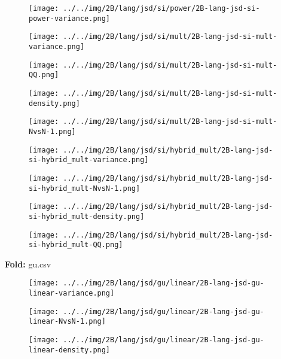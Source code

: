 \begin{figure}[H]
\centering	\texttt{[image: ../../img/2B/lang/jsd/si/power/2B-lang-jsd-si-power-variance.png]}
\end{figure}
\begin{figure}[H]
\centering	\texttt{[image: ../../img/2B/lang/jsd/si/mult/2B-lang-jsd-si-mult-variance.png]}
\end{figure}
\begin{figure}[H]
\centering	\texttt{[image: ../../img/2B/lang/jsd/si/mult/2B-lang-jsd-si-mult-QQ.png]}
\end{figure}
\begin{figure}[H]
\centering	\texttt{[image: ../../img/2B/lang/jsd/si/mult/2B-lang-jsd-si-mult-density.png]}
\end{figure}
\begin{figure}[H]
\centering	\texttt{[image: ../../img/2B/lang/jsd/si/mult/2B-lang-jsd-si-mult-NvsN-1.png]}
\end{figure}
\begin{figure}[H]
\centering	\texttt{[image: ../../img/2B/lang/jsd/si/hybrid\_mult/2B-lang-jsd-si-hybrid\_mult-variance.png]}
\end{figure}
\begin{figure}[H]
\centering	\texttt{[image: ../../img/2B/lang/jsd/si/hybrid\_mult/2B-lang-jsd-si-hybrid\_mult-NvsN-1.png]}
\end{figure}
\begin{figure}[H]
\centering	\texttt{[image: ../../img/2B/lang/jsd/si/hybrid\_mult/2B-lang-jsd-si-hybrid\_mult-density.png]}
\end{figure}
\begin{figure}[H]
\centering	\texttt{[image: ../../img/2B/lang/jsd/si/hybrid\_mult/2B-lang-jsd-si-hybrid\_mult-QQ.png]}
\end{figure}
\textbf{Fold:} gu.csv
\begin{figure}[H]
\centering	\texttt{[image: ../../img/2B/lang/jsd/gu/linear/2B-lang-jsd-gu-linear-variance.png]}
\end{figure}
\begin{figure}[H]
\centering	\texttt{[image: ../../img/2B/lang/jsd/gu/linear/2B-lang-jsd-gu-linear-NvsN-1.png]}
\end{figure}
\begin{figure}[H]
\centering	\texttt{[image: ../../img/2B/lang/jsd/gu/linear/2B-lang-jsd-gu-linear-density.png]}
\end{figure}
